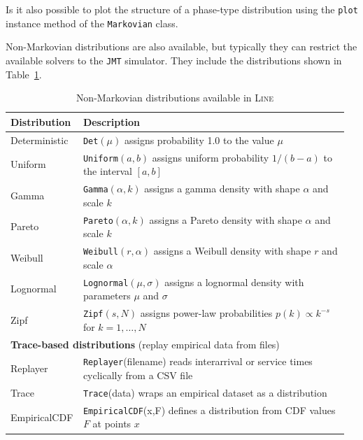 Is it also possible to plot the structure of a phase-type distribution using the \texttt{plot} instance method of the \texttt{Markovian} class.

Non-Markovian distributions are also available, but typically they can restrict the available solvers to the \texttt{JMT} simulator. They include the distributions shown in Table~\ref{tab:nonmarkov-dist}.

\begin{table}[t!]
\renewcommand{\arraystretch}{1.2}
\centering
\caption{Non-Markovian distributions available in \textsc{Line}}
\label{tab:nonmarkov-dist}
{\small
\begin{tabular}{|p{0.18\linewidth}|p{0.78\linewidth}|}
\hline
\textbf{Distribution} & \textbf{Description} \\
\hline
Deterministic & \texttt{Det}$(\mu)$ assigns probability 1.0 to the value $\mu$ \\
\hline
Uniform & \texttt{Uniform}$(a,b)$ assigns uniform probability $1/(b-a)$ to the interval $[a,b]$ \\
\hline
Gamma & \texttt{Gamma}$(\alpha, k)$ assigns a gamma density with shape $\alpha$ and scale $k$ \\
\hline
Pareto & \texttt{Pareto}$(\alpha, k)$ assigns a Pareto density with shape $\alpha$ and scale $k$ \\
\hline
Weibull & \texttt{Weibull}$(r, \alpha)$ assigns a Weibull density with shape $r$ and scale $\alpha$ \\
\hline
Lognormal & \texttt{Lognormal}$(\mu, \sigma)$ assigns a lognormal density with parameters $\mu$ and $\sigma$ \\
\hline
Zipf\index{Zipf distribution|see{Network models}} & \texttt{Zipf}$(s, N)$ assigns power-law probabilities $p(k) \propto k^{-s}$ for $k=1,\ldots,N$ \\
\hline
\multicolumn{2}{|l|}{\textbf{Trace-based distributions} (replay empirical data from files)} \\
\hline
Replayer & \texttt{Replayer}(filename) reads interarrival or service times cyclically from a CSV file \\
\hline
Trace & \texttt{Trace}(data) wraps an empirical dataset as a distribution \\
\hline
EmpiricalCDF & \texttt{EmpiricalCDF}(x,F) defines a distribution from CDF values $F$ at points $x$ \\
\hline
\end{tabular}
}
\end{table}

